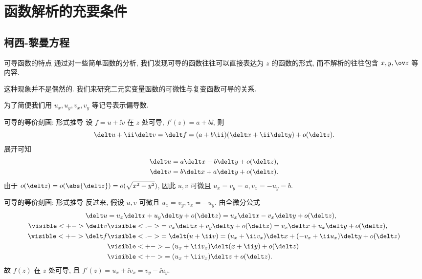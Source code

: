 \section{函数解析的充要条件}

\subsection{柯西-黎曼方程}
\begin{frame}{可导函数的特点}
	\onslide<+->
	通过对一些简单函数的分析, 我们发现可导的函数往往可以直接表达为 $z$ 的函数的形式, 而不解析的往往包含 $x,y,\ov z$ 等内容.

	\onslide<+->
	这种现象并不是偶然的.
	\onslide<+->
	我们来研究二元实变量函数的可微性与复变函数可导的关系.

	\onslide<+->
	为了简便我们用 $u_x,u_y,v_x,v_y$ 等记号表示偏导数.
\end{frame}


\begin{frame}{可导的等价刻画: 形式推导\noexer}
	\onslide<+->
	设 \alert{$f=u+\ii v$ 在 $z$ 处可导}, $f'(z)=a+b\ii$,
	\onslide<+->
	则
		\[
			\delt u+\ii\delt v
			=\delt f
			=(a+b\ii)(\delt x+\ii\delt y)+o(\delt z).
		\]
	\onslide<+->
	展开可知
		\begin{align*}
			\delt u&=a\delt x-b\delt y+o(\delt z),\\
			\delt v&=b\delt x+a\delt y+o(\delt z).
		\end{align*}
	\onslide<+->
	由于 $o(\delt z)=o(\abs{\delt z})=o(\sqrt{x^2+y^2})$,
	\onslide<+->
	因此 \alert{$u,v$ 可微且 $u_x=v_y=a,v_x=-u_y=b$}.
\end{frame}


\begin{frame}{可导的等价刻画: 形式推导\noexer}
	\onslide<+->
	反过来, 假设 \alert{$u,v$ 可微且 $u_x=v_y, v_x=-u_y$}.
	\onslide<+->
	由全微分公式
		\begin{align*}
			\delt u&=u_x\delt x+u_y\delt y+o(\delt z)
				=u_x\delt x-v_x\delt y+o(\delt z),\\
				\visible<+->{\delt v}&\visible<.->{=v_x\delt x+v_y\delt y+o(\delt z)
				=v_x\delt x+u_x\delt y+o(\delt z),}\\
			\visible<+->{\delt f}&
			\visible<.->{=\delt (u+\ii v)=(u_x+\ii v_x)\delt x+(-v_x+\ii u_x)\delt y+o(\delt z)}\\
			&\visible<+->{=(u_x+\ii v_x)\delt(x+\ii y)+o(\delt z)}\\
			&\visible<+->{=(u_x+\ii v_x)\delt z+o(\delt z).}
		\end{align*}
	\onslide<+->
	故 \alert{$f(z)$ 在 $z$ 处可导, 且 $f'(z)=u_x+\ii v_x=v_y-\ii u_y$}.
\end{frame}


